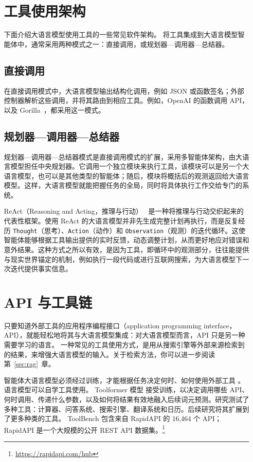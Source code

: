 \section{工具使用架构}
下面介绍大语言模型使用工具的一些常见软件架构。
将工具集成到大语言模型智能体中，通常采用两种模式之一：直接调用，或规划器—调用器—总结器。

\subsection*{直接调用}
在直接调用模式中，大语言模型输出结构化调用，例如 JSON 或函数签名；外部控制器解析这些调用，并将其路由到相应工具。例如，OpenAI 的函数调用 API，以及 Gorilla~\citep{patil2023gorillalargelanguagemodel}，都采用这一模式。

\subsection*{规划器—调用器—总结器}
规划器—调用器—总结器模式是直接调用模式的扩展，采用多智能体架构，由大语言模型担任中央规划器。它调用一个独立模块来执行工具，该模块可以是另一个大语言模型，也可以是其他类型的智能体；随后，模块将概括后的观测返回给大语言模型。这样，大语言模型就能把握任务的全局，同时将具体执行工作交给专门的系统。

ReAct（Reasoning and Acting，推理与行动）~\citep{yao2022react} 是一种将推理与行动交织起来的代表性框架。使用 ReAct 的大语言模型并非先生成完整计划再执行，而是反复经历 \texttt{Thought}（思考）、\texttt{Action}（动作）和 \texttt{Observation}（观测）的迭代循环。这使智能体能够根据工具输出提供的实时反馈，动态调整计划，从而更好地应对错误和意外结果。这种方式之所以有效，是因为工具，即循环中的观测部分，往往能提供与现实世界锚定的机制，例如执行一段代码或进行互联网搜索，为大语言模型下一次迭代提供事实信息。


\section{API 与工具链}


只要知道外部工具的应用程序编程接口（application programming interface，API），就能轻松地将其与大语言模型集成：对大语言模型而言，API 只是另一种需要学习的语言。
一种常见的工具使用方式，是用从搜索引擎等外部来源检索到的结果，来增强大语言模型的输入。关于检索方法，你可以进一步阅读第~\ref{sec:rag}~章。

智能体大语言模型必须经过训练，才能根据任务决定何时、如何使用外部工具 \citep{shen2024small}。
语言模型可以自学工具使用。
Toolformer 模型 \citep{schick2023toolformer} 接受训练，以决定调用哪些 API、何时调用、传递什么参数，以及如何将结果有效地融入后续词元预测。研究测试了多种工具：计算器、问答系统、搜索引擎、翻译系统和日历。后续研究将其扩展到了更多种类的工具。
ToolBench \citep{qin2023toolllm} 包含来自 RapidAPI 的 16,464 个 API；RapidAPI 是一个大规模的公开 REST API 数据集。\footnote{ \url{https://rapidapi.com/hub}}

